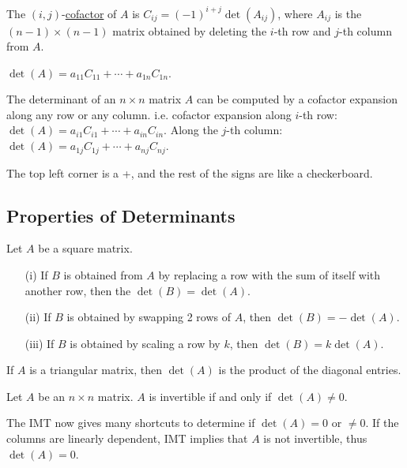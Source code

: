 \documentclass[10pt,a4paper]{article}
\begin{document}
\begin{definition}[Cofactor]
	The $(i,j)$-\underline{cofactor} of $A$ is $C_{ij} = (-1)^{i+j} \det(A_{ij})$, where $A_{ij}$ is the $(n-1)\times (n-1)$ matrix obtained by deleting the $i$-th row and $j$-th column from $A$.
\end{definition}
\begin{note}
$\det(A) = a_{11} C_{11} + \cdots + a_{1n} C_{1n}$.
\end{note}

\begin{theorem}
	The determinant of an $n\times n$ matrix $A$ can be computed by a cofactor expansion along any row or any column. i.e. cofactor expansion along $i$-th row: $\det(A) = a_{i1} C_{i1} + \cdots + a_{in} C_{in}$. 
	Along the $j$-th column: $\det(A) = a_{1j} C_{1j} + \cdots + a_{nj} C_{nj}$.
\end{theorem}
\begin{remark}[on signs]
	The top left corner is a +, and the rest of the signs are like a checkerboard.
\end{remark}

\subsection{Properties of Determinants}

\begin{theorem}
	Let $A$ be a square matrix. 
	\begin{enumerate}
		\item[(i)] If $B$ is obtained from $A$ by replacing a row with the sum of itself with another row, then the $\det(B) = \det(A)$.
		\item[(ii)] If $B$ is obtained by swapping 2 rows of $A$, then $\det(B) = - \det(A)$.
		\item[(iii)] If $B$ is obtained by scaling a row by $k$, then $\det(B) = k \det(A)$.
	\end{enumerate}
\end{theorem}

\begin{theorem}
	If $A$ is a triangular matrix, then $\det(A)$ is the product of the diagonal entries.
\end{theorem}

\begin{theorem}
	Let $A$ be an $n\times n$ matrix. $A$ is invertible if and only if $\det(A) \neq 0$.
\end{theorem}
\begin{remark}
	The IMT now gives many shortcuts to determine if $\det(A) = 0$ or $\neq 0$. If the columns are linearly dependent, IMT implies that $A$ is not invertible, thus $\det(A) = 0$.
\end{remark}
\end{document}
